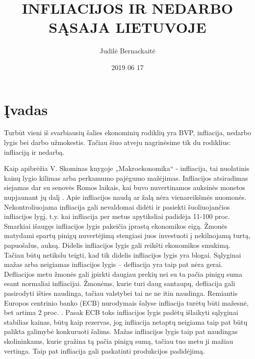 \documentclass[11pt, titlepage]{article}
\title{INFLIACIJOS IR NEDARBO SĄSAJA LIETUVOJE}
\author{Judilė Bernackaitė}
\date{2019 06 17}
\begin{document}
\maketitle
\newpage
\tableofcontents
\newpage

\section{Įvadas}

Turbūt vieni iš svarbiausių šalies ekonominių rodiklių yra BVP, infliacija, nedarbo lygis bei darbo užmokestis. Tačiau šiuo atveju nagrinėsime tik du rodiklius: infliaciją ir nedarbą.

Kaip apibrėžia V. Skominas knygoje „Makroekonomika“ - infliacija, tai nuolatinis kainų lygio kilimas arba perkamumo pajėgumo mažėjimas. Infliacijos atsiradimas siejamas dar su senovės Romos laikais, kai buvo nuvertinamos auksinės monetos nupjaunant jų dalį \cite{linapaliu2015}. Apie infliacijos naudą ar žalą nėra vienareikšmės nuomonės. Nekontroliuojama infliacija gali nevaldomai didėti ir pasiekti šuoliuojančios infliacijos lygį, t.y. kai infliacija per metus apytiksliai padidėja 11-100 proc. Smarkiai išaugęs infliacijos lygis pakeičia įprastą ekonomikos eigą. Žmonės matydami spartų pinigų nuvertėjimą stengiasi juos investuoti į nekilnojamą turtą, papuošalus, auksą. Didelis infliacijos lygis gali reikšti ekonomikos smukimą. Tačiau būtų netikslu teigti, kad tik didelis infliacijos lygis yra blogai. Sąlyginai mažas arba neigiamas infliacijos lygis – defliacija yra taip pat nėra gerai. Defliacijos metu žmonės gali įpirkti daugiau prekių nei su ta pačia pinigų suma esant normaliai infliacijai. Žmonėms, kurie turi daug santaupų, defliacija gali pasirodyti išties naudinga, tačiau valstybei tai ne ne itin naudinga. Remiantis Europos centrinio banko (ECB) nurodymais šalyse infliacija turėtų būti mažesnė, bet artima 2 proc. \cite{europoscentrinisbankas2017}. Pasak ECB toks infliacijos lygis padėtų išlaikyti sąlyginai stabilias kainas, būtų kaip rezervas, jog infliacija netaptų neigiama taip pat būtų palikta galimybė konkuruoti šalims. Mažas infliacijos lygis taip pat naudingas skolininkams, kurie gražina tą pačia pinigų sumą, tačiau tuo metu ji mažiau vertinga. Taip pat infliacija gali paskatinti produkcijos padidėjimą.
\end{document}
